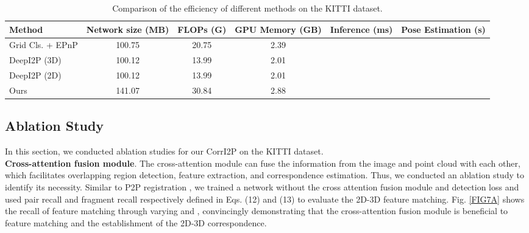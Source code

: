 \documentclass[lettersize,journal]{IEEEtran}
\begin{document}
\begin{table*}[h]
    \centering
    \renewcommand\arraystretch{1.5}
    \caption{Comparison of the efficiency of different methods on the KITTI dataset.}
\begin{tabular}{l|c|c|c|c|c}
    \hline\hline
     Method &  Network size (MB) & FLOPs (G) & GPU Memory (GB) &Inference (ms) & Pose Estimation (s)  \\
    \hline
    Grid Cls. + EPnP   &  100.75  & 20.75  & 2.39  &    & \\
    \hline
    DeepI2P (3D)  & 100.12 & 13.99 & 2.01  &    & \\
DeepI2P (2D) & 100.12 & 13.99 & 2.01  &     & \\
    \hline
    Ours         & 141.07    & 30.84 & 2.88 &     &   \\
    \hline\hline
    \end{tabular}   \label{TAB4}
\end{table*}


\subsection{Ablation Study}
In this section, we conducted ablation studies for our CorrI2P on the KITTI dataset. \\


\noindent\textbf{Cross-attention fusion module}.
The cross-attention module can fuse the information from the image and point cloud with each other, which facilitates overlapping region detection, feature extraction, and correspondence estimation. Thus, we conducted an ablation study to identify its necessity. Similar to P2P registration \cite{PPFNET}, we trained a network without the cross attention fusion module and detection loss and used pair recall  and fragment recall  respectively defined in Eqs. (12) and (13) to evaluate the 2D-3D feature matching. 
Fig. \ref{FIG7A} shows the recall of feature matching through varying  and , convincingly demonstrating that the cross-attention fusion module is beneficial to feature matching and the establishment of the 2D-3D correspondence. \\
\end{document}
